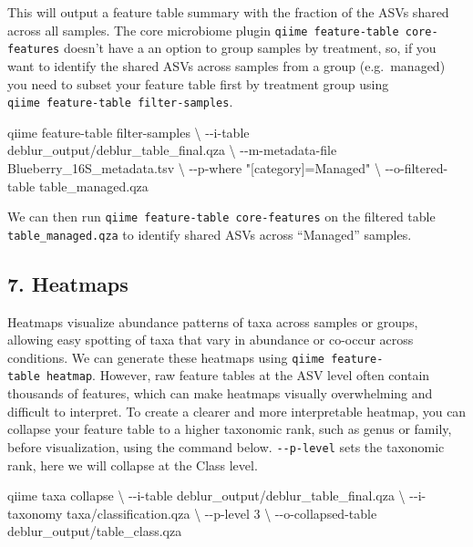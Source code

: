 \documentclass[
]{book}
\newenvironment{Shaded}{\begin{snugshade}}{\end{snugshade}}
\newcommand{\AttributeTok}[1]{\textcolor[rgb]{0.13,0.29,0.53}{#1}}
\newcommand{\DataTypeTok}[1]{\textcolor[rgb]{0.13,0.29,0.53}{#1}}
\newcommand{\ExtensionTok}[1]{#1}
\newcommand{\NormalTok}[1]{#1}
\newcommand{\StringTok}[1]{\textcolor[rgb]{0.31,0.60,0.02}{#1}}
\begin{document}
This will output a feature table summary with the fraction of the ASVs shared across all samples. The core microbiome plugin \texttt{qiime\ feature-table\ core-features} doesn't have a an option to group samples by treatment, so, if you want to identify the shared ASVs across samples from a group (e.g.~managed) you need to subset your feature table first by treatment group using \texttt{qiime\ feature-table\ filter-samples}.

\begin{Shaded}
\begin{Highlighting}[]
\ExtensionTok{qiime}\NormalTok{ feature{-}table filter{-}samples }\DataTypeTok{\textbackslash{}}
  \AttributeTok{{-}{-}i{-}table}\NormalTok{ deblur\_output/deblur\_table\_final.qza }\DataTypeTok{\textbackslash{}}
  \AttributeTok{{-}{-}m{-}metadata{-}file}\NormalTok{ Blueberry\_16S\_metadata.tsv }\DataTypeTok{\textbackslash{}}
  \AttributeTok{{-}{-}p{-}where} \StringTok{"[category]=\textquotesingle{}Managed\textquotesingle{}"} \DataTypeTok{\textbackslash{}}
  \AttributeTok{{-}{-}o{-}filtered{-}table}\NormalTok{ table\_managed.qza}
\end{Highlighting}
\end{Shaded}

We can then run \texttt{qiime\ feature-table\ core-features} on the filtered table \texttt{table\_managed.qza} to identify shared ASVs across ``Managed'' samples.

\subsection{7. Heatmaps}\label{heatmaps}

Heatmaps visualize abundance patterns of taxa across samples or groups, allowing easy spotting of taxa that vary in abundance or co-occur across conditions. We can generate these heatmaps using \texttt{qiime\ feature-table\ heatmap}. However, raw feature tables at the ASV level often contain thousands of features, which can make heatmaps visually overwhelming and difficult to interpret. To create a clearer and more interpretable heatmap, you can collapse your feature table to a higher taxonomic rank, such as genus or family, before visualization, using the command below. \texttt{-\/-p-level} sets the taxonomic rank, here we will collapse at the Class level.

\begin{Shaded}
\begin{Highlighting}[]

\ExtensionTok{qiime}\NormalTok{ taxa collapse }\DataTypeTok{\textbackslash{}}
  \AttributeTok{{-}{-}i{-}table}\NormalTok{ deblur\_output/deblur\_table\_final.qza }\DataTypeTok{\textbackslash{}}
  \AttributeTok{{-}{-}i{-}taxonomy}\NormalTok{ taxa/classification.qza }\DataTypeTok{\textbackslash{}}
  \AttributeTok{{-}{-}p{-}level}\NormalTok{ 3 }\DataTypeTok{\textbackslash{}}
  \AttributeTok{{-}{-}o{-}collapsed{-}table}\NormalTok{ deblur\_output/table\_class.qza}
\end{Highlighting}
\end{Shaded}
\end{document}
